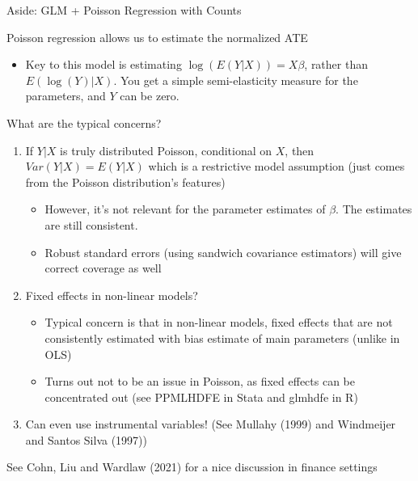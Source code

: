 \documentclass[notes,11pt, aspectratio=169]{beamer}
\newenvironment{wideitemize}{\itemize\addtolength{\itemsep}{10pt}}{\enditemize}
\begin{document}
  \begin{frame}{Aside: GLM + Poisson Regression with Counts}
    \begin{wideitemize}
    \item Poisson regression allows us to estimate the normalized ATE
      \begin{itemize}
      \item Key to this model is estimating $\log(E(Y|X)) = X\beta$,
        rather than $E(\log(Y)|X)$. You get a simple semi-elasticity
        measure for the parameters, and $Y$ can be zero.
      \end{itemize}
    \item What are the typical concerns?
      \begin{enumerate}
      \item       If $Y | X$ is truly distributed
      Poisson, conditional on $X$, then $Var(Y|X) = E(Y|X)$ which is a
      restrictive model assumption (just comes from the Poisson
      distribution's features)
      \begin{itemize}
      \item However, it's not relevant for the parameter estimates of
        $\beta$. The estimates are still consistent.
      \item Robust standard errors (using sandwich covariance
        estimators) will give correct coverage as well
      \end{itemize}
    \item Fixed effects in non-linear models?
      \begin{itemize}
      \item Typical concern is that in non-linear models, fixed
        effects that are not consistently estimated with bias estimate
        of main parameters (unlike in OLS)
      \item Turns out not to be an issue in Poisson, as fixed effects
        can be concentrated out (see PPMLHDFE in Stata and glmhdfe in
        R)
      \end{itemize}
    \item Can even use instrumental variables! (See Mullahy (1999) and
      Windmeijer and Santos Silva (1997))
    \end{enumerate}
  \item See Cohn, Liu and Wardlaw (2021) for a nice discussion in finance settings
    \end{wideitemize}
  \end{frame}
\end{document}
